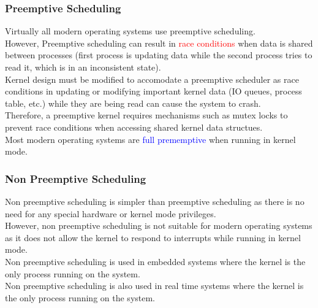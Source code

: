 \documentclass[oneside]{book}
\begin{document}
                \subsubsection{Preemptive Scheduling}
                    Virtually all modern operating systems use preemptive scheduling.\\
                    However, Preemptive scheduling can result in \textcolor{red}{race conditions} when
                    data is shared between processes (first process is updating data while the second process
                    tries to read it, which is in an inconsistent state).\\
                    Kernel design must be modified to accomodate a preemptive scheduler as race conditions
                    in updating or modifying important kernel data (IO queues, process table, etc.) while they 
                    are being read can cause the system to crash.\\
                    Therefore, a preemptive kernel requires mechanisms such as mutex locks to prevent race conditions
                    when accessing shared kernel data structues.\\
                    Most modern operating systems are \textcolor{blue}{full prememptive} when running in kernel mode.
                \subsubsection{Non Preemptive Scheduling}
                    Non preemptive scheduling is simpler than preemptive scheduling as there is no need 
                    for any special hardware or kernel mode privileges.\\
                    However, non preemptive scheduling is not suitable for modern operating systems as it   
                    does not allow the kernel to respond to interrupts while running in kernel mode.\\
                    Non preemptive scheduling is used in embedded systems where the kernel is the only process
                    running on the system.\\
                    Non preemptive scheduling is also used in real time systems where the kernel is the only process 
                    running on the system.\\
\end{document}
